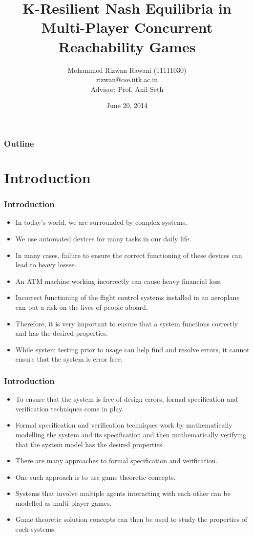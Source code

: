 \documentclass{beamer}
\title[K-Resilient Nash Equilibria in Reachability Games]{K-Resilient Nash Equilibria in Multi-Player Concurrent Reachability Games}
\author[Mohammed Rizwan Rawani, rizwan@cse.iitk.ac.in]{Mohammed Rizwan Rawani (11111030) \\rizwan@cse.iitk.ac.in\\Advisor: Prof. Anil Seth}
\institute{Department of Computer Science and Engineering \\Indian Institute of Technology Kanpur}
\date{June 20, 2014}
\begin{document}
\begin{frame}
\titlepage
\end{frame}

\begin{frame}
\frametitle{Outline}
\tableofcontents[shaded]
\end{frame}


\section[Introduction]{Introduction}
\begin{frame}
 \frametitle{Introduction}
\begin{itemize}
	\item In today's world, we are surrounded by complex systems.
	\item We use automated devices for many tasks in our daily life.
	\item In many cases, failure to ensure the correct functioning of these devices can lead to heavy losses.
	\item An ATM machine working incorrectly can cause heavy financial loss.
	\item Incorrect functioning of the flight control systems installed in an aeroplane can put a risk on the lives of people aboard.
	\item Therefore, it is very important to ensure that a system functions correctly and has the desired properties.
	\item While system testing prior to usage can help find and resolve errors, it cannot ensure that the system is error free.
\end{itemize}
\end{frame}

\begin{frame}
 \frametitle{Introduction}
\begin{itemize}
	\item To ensure that the system is free of design errors, formal specification and verification techniques come in play.
	\item Formal specification and verification techniques work by mathematically modelling the system and its specification and then mathematically verifying that the system model has the desired properties.
	\item There are many approaches to formal specification and verification.
	\item One such approach is to use game theoretic concepts.
	\item Systems that involve multiple agents interacting with each other can be modelled as multi-player games.
	\item Game theoretic solution concepts can then be used to study the properties of such systems.
\end{itemize}
\end{frame}
\end{document}
